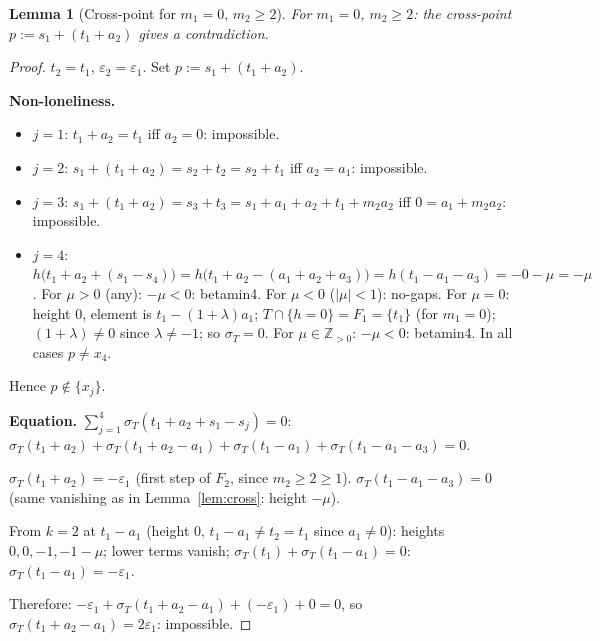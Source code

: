 \documentclass{article}
\newtheorem{lemma}{Lemma}
\begin{document}
\begin{lemma}[Cross-point for $m_1=0$, $m_2\ge 2$]\label{lem:cross0}
For $m_1=0$, $m_2\ge 2$: the cross-point $p:=s_1+(t_1+a_2)$ gives a contradiction.
\end{lemma}
\begin{proof}
$t_2=t_1$, $\varepsilon_2=\varepsilon_1$.
Set $p:=s_1+(t_1+a_2)$.

\textbf{Non-loneliness.}
\begin{itemize}
\item $j=1$: $t_1+a_2=t_1$ iff $a_2=0$: impossible.
\item $j=2$: $s_1+(t_1+a_2)=s_2+t_2=s_2+t_1$ iff $a_2=a_1$: impossible.
\item $j=3$: $s_1+(t_1+a_2)=s_3+t_3=s_1+a_1+a_2+t_1+m_2a_2$ iff $0=a_1+m_2a_2$: impossible.
\item $j=4$: $h\bigl(t_1+a_2+(s_1-s_4)\bigr)=h\bigl(t_1+a_2-(a_1+a_2+a_3)\bigr)=h(t_1-a_1-a_3)=-0-\mu=-\mu$.
  For $\mu>0$ (any): $-\mu<0$: betamin4. For $\mu<0$ ($|\mu|<1$): no-gaps. For $\mu=0$: height $0$, element is $t_1-(1+\lambda)a_1$; $T\cap\{h=0\}=F_1=\{t_1\}$ (for $m_1=0$); $(1+\lambda)\ne 0$ since $\lambda\ne-1$; so $\sigma_T=0$.  For $\mu\in\mathbb{Z}_{>0}$: $-\mu<0$: betamin4.  In all cases $p\ne x_4$.
\end{itemize}
Hence $p\notin\{x_j\}$.

\textbf{Equation.}
$\sum_{j=1}^4\sigma_T(t_1+a_2+s_1-s_j)=0$:
$\sigma_T(t_1+a_2)+\sigma_T(t_1+a_2-a_1)+\sigma_T(t_1-a_1)+\sigma_T(t_1-a_1-a_3)=0$.

$\sigma_T(t_1+a_2)=-\varepsilon_1$ (first step of $F_2$, since $m_2\ge 2\ge 1$).
$\sigma_T(t_1-a_1-a_3)=0$ (same vanishing as in Lemma~\ref{lem:cross}: height $-\mu$).

From $k=2$ at $t_1-a_1$ (height $0$, $t_1-a_1\ne t_2=t_1$ since $a_1\ne 0$):
heights $0,0,-1,-1-\mu$; lower terms vanish; $\sigma_T(t_1)+\sigma_T(t_1-a_1)=0$:
$\sigma_T(t_1-a_1)=-\varepsilon_1$.

Therefore: $-\varepsilon_1+\sigma_T(t_1+a_2-a_1)+(-\varepsilon_1)+0=0$,
so $\sigma_T(t_1+a_2-a_1)=2\varepsilon_1$: impossible.
\end{proof}
\end{document}

